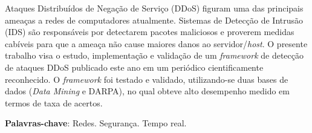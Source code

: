 \setlength{\absparsep}{18pt} %
\begin{resumo}[RESUMO]
      Ataques Distribuídos de Negação de Serviço (DDoS) figuram uma das principais ameaças a redes de computadores atualmente. Sistemas de Detecção de Intrusão (IDS) são responsáveis por detectarem pacotes maliciosos e proverem medidas cabíveis para que a ameaça não cause maiores danos ao servidor/\textit{host}. O presente trabalho visa o estudo, implementação e validação de um \textit{framework} de detecção de ataques DDoS publicado este ano em um periódico cientificamente reconhecido. O \textit{framework} foi testado e validado, utilizando-se duas bases de dados (\textit{Data Mining} e DARPA), no qual obteve alto desempenho medido em termos de taxa de acertos.
      
\textbf{Palavras-chave}: Redes. Segurança. Tempo real.
\end{resumo}